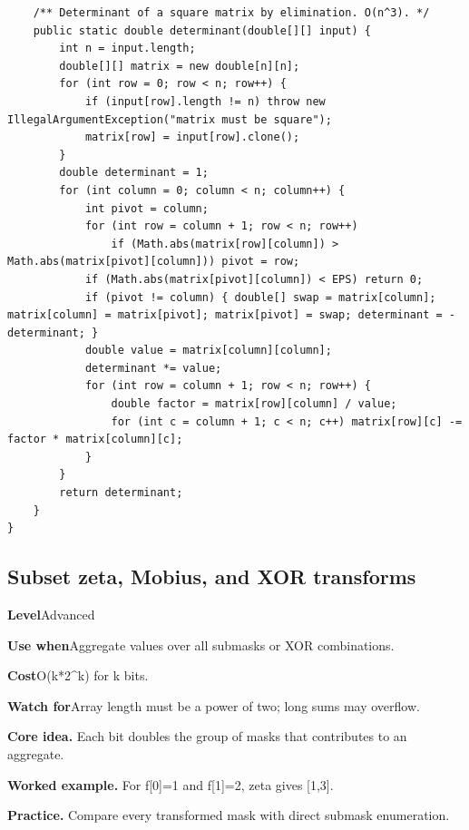 \documentclass[10pt,letterpaper]{article}
\newcommand{\entrylabel}[1]{\textcolor{accent}{\bfseries #1}}
\begin{document}
\begin{lstlisting}
    /** Determinant of a square matrix by elimination. O(n^3). */
    public static double determinant(double[][] input) {
        int n = input.length;
        double[][] matrix = new double[n][n];
        for (int row = 0; row < n; row++) {
            if (input[row].length != n) throw new IllegalArgumentException("matrix must be square");
            matrix[row] = input[row].clone();
        }
        double determinant = 1;
        for (int column = 0; column < n; column++) {
            int pivot = column;
            for (int row = column + 1; row < n; row++)
                if (Math.abs(matrix[row][column]) > Math.abs(matrix[pivot][column])) pivot = row;
            if (Math.abs(matrix[pivot][column]) < EPS) return 0;
            if (pivot != column) { double[] swap = matrix[column]; matrix[column] = matrix[pivot]; matrix[pivot] = swap; determinant = -determinant; }
            double value = matrix[column][column];
            determinant *= value;
            for (int row = column + 1; row < n; row++) {
                double factor = matrix[row][column] / value;
                for (int c = column + 1; c < n; c++) matrix[row][c] -= factor * matrix[column][c];
            }
        }
        return determinant;
    }
}
\end{lstlisting}
\subsection{Subset zeta, Mobius, and XOR transforms}
\begin{guidebox}\small
\entrylabel{Level}\quad Advanced\par
\entrylabel{Use when}\quad Aggregate values over all submasks or XOR combinations.\par
\entrylabel{Cost}\quad O(k*2\textasciicircum{}k) for k bits.\par
\entrylabel{Watch for}\quad Array length must be a power of two; long sums may overflow.\par
\end{guidebox}
\noindent\textbf{Core idea.} Each bit doubles the group of masks that contributes to an aggregate.\par
\noindent\textbf{Worked example.} For f[0]=1 and f[1]=2, zeta gives [1,3].\par
\noindent\textbf{Practice.} Compare every transformed mask with direct submask enumeration.\par
\end{document}

